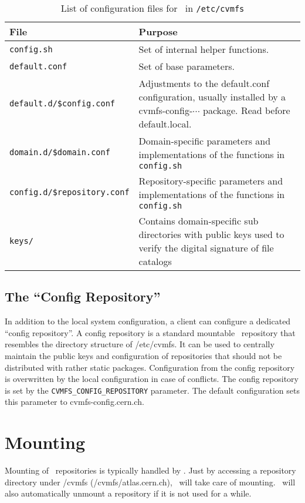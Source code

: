 \begin{table}
	\begin{center}
		\begin{tabularx}{\linewidth}{lX}
			\toprule
			{\bf\centering File} & {\bf\centering Purpose} \\
			\midrule
			\texttt{config.sh} & Set of internal helper functions. \\
			\texttt{default.conf} & Set of base parameters.\\
			\texttt{default.d/\$config.conf} & Adjustments to the default.conf configuration, usually installed by a cvmfs-config-$\cdots$ package.  Read before default.local.\\
			\texttt{domain.d/\$domain.conf} & Domain-specific parameters and implementations of the functions in \texttt{config.sh} \\
			\texttt{config.d/\$repository.conf} & Repository-specific parameters and implementations of the functions in \texttt{config.sh} \\
			\texttt{keys/} & Contains domain-specific sub directories with public keys used to verify the digital signature of file catalogs \\
			\bottomrule
		\end{tabularx}
	\end{center}
	\caption{List of configuration files for \cvmfs\ in \texttt{/etc/cvmfs}}
	\label{tbl:configfiles}
\end{table}

\subsection{The ``Config Repository''}
In addition to the local system configuration, a client can configure a dedicated ``config repository''.
A config repository is a standard mountable \cvmfs\ repository that resembles the directory structure of /etc/cvmfs.
It can be used to centrally maintain the public keys and configuration of repositories that should not be distributed with rather static packages.
Configuration from the config repository is overwritten by the local configuration in case of conflicts.
The config repository is set by the \texttt{CVMFS\_CONFIG\_REPOSITORY} parameter.
The default configuration sets this parameter to cvmfs-config.cern.ch.

\section{Mounting}
Mounting of \cvmfs\ repositories is typically handled by \autofs.
Just by accessing a repository directory under /cvmfs (\eg /cvmfs/atlas.cern.ch), \autofs\ will take care of mounting.
\autofs\ will also automatically unmount a repository if it is not used for a while.

